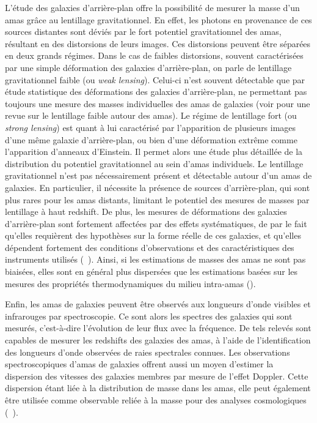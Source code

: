 L'étude des galaxies d'arrière-plan offre la possibilité de mesurer la masse d'un amas grâce au lentillage gravitationnel.
En effet, les photons en provenance de ces sources distantes sont déviés par le fort potentiel gravitationnel des amas, résultant en des distorsions de leurs images.
Ces distorsions peuvent être séparées en deux grands régimes.
Dans le cas de faibles distorsions, souvent caractérisées par une simple déformation des galaxies d'arrière-plan, on parle de lentillage gravitationnel faible (ou \textit{weak lensing}).
Celui-ci n'est souvent détectable que par étude statistique des déformations des galaxies d'arrière-plan, ne permettant pas toujours une mesure des masses individuelles des amas de galaxies (voir \cite{umetsu_clustergalaxy_2020} pour une revue sur le lentillage faible autour des amas).
Le régime de lentillage fort (ou \textit{strong lensing}) est quant à lui caractérisé par l'apparition de plusieurs images d'une même galaxie d'arrière-plan, ou bien d'une déformation extrême comme l'apparition d'anneaux d'Einstein.
Il permet alors une étude plus détaillée de la distribution du potentiel gravitationnel au sein d'amas individuels.
Le lentillage gravitationnel n'est pas nécessairement présent et détectable autour d'un amas de galaxies.
En particulier, il nécessite la présence de sources d'arrière-plan, qui sont plus rares pour les amas distants, limitant le potentiel des mesures de masses par lentillage à haut redshift.
De plus, les mesures de déformations des galaxies d'arrière-plan sont fortement affectées par des effets systématiques, de par le fait qu'elles requièrent des hypothèses sur la forme réelle de ces galaxies, et qu'elles dépendent fortement des conditions d'observations et des caractéristiques des instruments utilisés (\eg\ \cite{becker_accuracy_2011,mandelbaum_instrumental_2015,grandis_calibration_2021,sommer_weak_2021}).
Ainsi, si les estimations de masses des amas ne sont pas biaisées\footnotemark, elles sont en général plus dispersées que les estimations basées sur les mesures des propriétés thermodynamiques du milieu intra-amas (\cite{pratt_galaxy_2019,umetsu_clustergalaxy_2020,grandis_calibration_2021}).

Enfin, les amas de galaxies peuvent être observés aux longueurs d'onde visibles et infrarouges par spectroscopie.
Ce sont alors les spectres des galaxies qui sont mesurés, c'est-à-dire l'évolution de leur flux avec la fréquence.
De tels relevés sont capables de mesurer les redshifts des galaxies des amas, à l'aide de l'identification des longueurs d'onde observées de raies spectrales connues.
Les observations spectroscopiques d'amas de galaxies offrent aussi un moyen d'estimer la dispersion des vitesses des galaxies membres par mesure de l'effet Doppler.
Cette dispersion étant liée à la distribution de masse dans les amas, elle peut également être utilisée comme observable reliée à la masse pour des analyses cosmologiques (\eg\ \cite{munari_relation_2013, ferragamo_biases_2020}).

